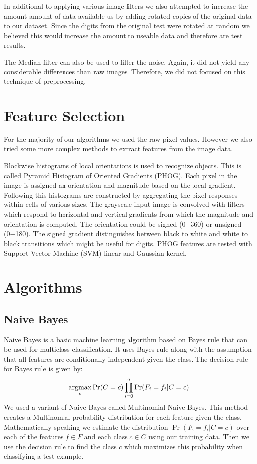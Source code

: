 \documentclass[10pt,twocolumn]{article}
\newcommand{\argmax}{\operatornamewithlimits{argmax}}
\begin{document}
In additional to applying various image filters we also attempted to increase the amount amount of data available us by adding rotated copies of the original data to our dataset. Since the digits from the original test were rotated at random we believed this would increase the amount to useable data and therefore are test results.

The Median filter can also be used to filter the noise. Again, it did not yield any considerable differences than raw images. Therefore, we did not focused on this technique of preprocessing.
\section{Feature Selection}
For the majority of our algorithms we used the raw pixel values. However we also tried some  more complex methods to extract features from the image data.

\cite{Maji09fastand} Blockwise histograms of local orientations is used to recognize objects. This is called Pyramid Histogram of Oriented Gradients (PHOG). Each pixel in the image is assigned an orientation and magnitude based on the local gradient. Following this histograms are constructed by aggregating the pixel responses within cells of various sizes. The grayscale input image is convolved with filters which respond to horizontal and vertical gradients from which the magnitude and orientation is computed. The orientation could be signed (0−360) or unsigned (0−180). The signed gradient distinguishes between black to white and white to black transitions which might be useful for digits. PHOG features are tested with Support Vector Machine (SVM) linear and Gaussian kernel. 
\section{Algorithms}
\subsection{Naive Bayes}
Naive Bayes is a basic machine learning algorithm based on Bayes rule that can be used for multiclass classification. It uses Bayes rule along with the assumption that all features are conditionally independent given the class. The decision rule for Bayes rule is given by:
\[ \argmax_c \Pr(C = c) \prod_{i=0}^{n} \Pr(F_i = f_i | C = c)\]
We used a variant of Naive Bayes called Multinomial Naive Bayes. This method creates a Multinomial probability distribution for each feature given the class. Mathematically speaking we estimate the distribution $\Pr(F_i = f_i | C = c)$ over each of the features $f \in F$ and each class $ c \in C$ using our training data. Then we use the decision rule to find the class $c$ which maximizes this probability when classifying a test example.
\end{document}
